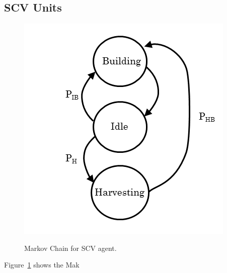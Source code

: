 \subsection{SCV Units}

\begin{figure}
\centering
\includegraphics[scale=0.8, trim = 0cm 0cm 0cm 0cm]{diagrams/scv}
\label{fig:scv_diagram}
\caption{Markov Chain for SCV agent.}
\end{figure}

Figure~\ref{fig:scv_diagram} shows the Mak